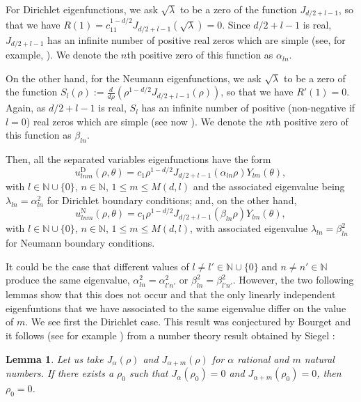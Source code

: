 \documentclass{amsart}
\newtheorem{lemma}[theorem]{Lemma}
\theoremstyle{definition}
\theoremstyle{remark}
\def\NN{\mathbb{N}}
\renewcommand\leq\leqslant
\numberwithin{equation}{section}
\theoremstyle{definition}
\theoremstyle{remark}
\def\NN{\mathbb{N}}
\begin{document}
For Dirichlet eigenfunctions, we ask $\sqrt{\lambda}$ to be a zero of the function $J_{d/2+l-1}$, so that we have $R(1)=c_11^{1-d/2}J_{d/2+l-1}\left(\sqrt{\lambda}\right)=0$. Since $d/2+l-1$ is real, $J_{d/2+l-1}$ has an infinite number of positive real zeros which are simple (see, for example, \cite[p.370]{AS}). We denote the $n$th positive zero of this function as $\alpha_{ln}$. 

On the other hand, for the Neumann eigenfunctions, we ask  $\sqrt{\lambda}$ to be a zero of the function $S_l(\rho):=\frac{d}{d\rho}\left(\rho^{1-d/2}J_{d/2+l-1}\left(\rho\right)\right)$, so that we have $R'(1)=0$. Again, as $d/2+l-1$ is real, $S_l$ has an infinite number of positive (non-negative if $l=0$) real zeros which are simple (see now \cite [Proposition 2.3.]{Helf}). We denote the $n$th positive zero of this function as $\beta_{ln}$. 

Then, all the separated variables eigenfunctions have the form \begin{equation*}
	u_{lnm}^\mathrm{D}(\rho,\theta)=c_1\rho^{1-d/2}J_{d/2+l-1}\left(\alpha_{ln}\rho \right)Y_{lm}\left(\theta\right),
\end{equation*}with $l\in\mathbb{N}\cup\{0\}$, $n\in\mathbb{N}$, $1\leq m\leq M(d,l)$ and the  associated eigenvalue being $\lambda_{ln}=\alpha_{ln}^2$ for Dirichlet boundary conditions; and, on the other hand, \begin{equation*}
	u_{lnm}^\mathrm{N}(\rho,\theta)=c_1\rho^{1-d/2}J_{d/2+l-1}\left(\beta_{ln}\rho \right)Y_{lm}\left(\theta\right),
\end{equation*}with $l\in\mathbb{N}\cup\{0\}$, $n\in\mathbb{N}$, $1\leq m\leq M(d,l)$, with  associated eigenvalue $\lambda_{ln}=\beta_{ln}^2$ for Neumann boundary conditions.

It could be the case that different values of $l\neq l'\in\NN\cup\{0\}$ and $n\neq n'\in\NN$ produce the same eigenvalue, $\alpha_{ln}^2=\alpha_{l'n'}^2$ or  $\beta_{ln}^2=\beta_{l'n'}^2$. However, the two following lemmas show that this does not occur and that the only linearly independent eigenfuntions that we have associated to the same eigenvalue differ on the value of $m$. We see first the Dirichlet case. This result was conjectured by Bourget and it follows (see for example \cite[p.464]{ISK}) from a number theory result obtained by Siegel \cite{Siegel}:

\begin{lemma} 
	Let us take $J_\alpha(\rho)$ and $J_{\alpha+m}(\rho)$ for $\alpha$ rational and $m$ natural numbers. If there exists a $\rho_0$ such that $J_\alpha(\rho_0)=0$ and $J_{\alpha+m}(\rho_0)=0$, then $\rho_0=0$.
\end{lemma} 
\end{document}
